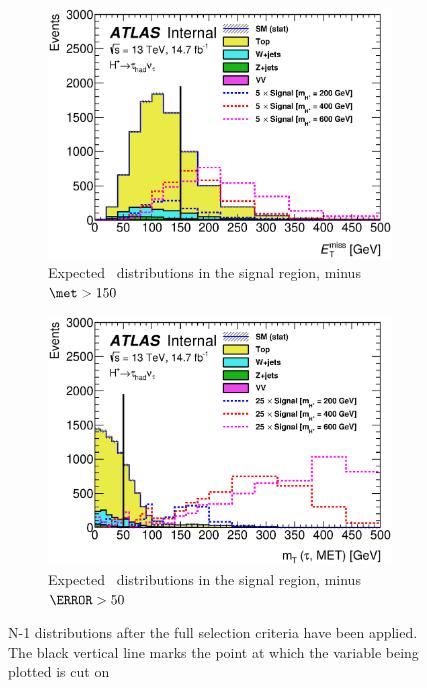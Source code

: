 \begin{figure}[!h]
\begin{subfigure}{0.5\textwidth}
   \includegraphics[width=\textwidth]{figures/met_nMinus1_expected.eps}
\caption{Expected \met\ distributions in the signal region, minus $\met>150$~\GeV}
\label{fig:preselectA}
\end{subfigure} %
\begin{subfigure}{0.5\textwidth}
   \includegraphics[width=\textwidth]{figures/mT_nMinus1_expected.eps}
\caption{Expected \mT\ distributions in the signal region, minus $\mT>50$~\GeV}
\label{fig:preselectB}
\end{subfigure}
\caption{N-1 distributions after the full selection criteria have been applied. The black 
vertical line marks the point at which the variable being plotted is cut on}
\end{figure}

